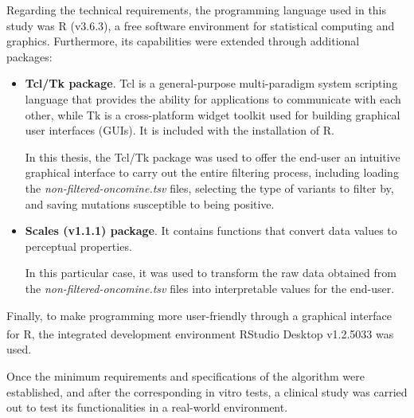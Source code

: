 Regarding the technical requirements, the programming language used in this study was \textsf{R} (v3.6.3), a free software environment for statistical computing and graphics. Furthermore, its capabilities were extended through additional packages:
\begin{itemize}
    \item \textbf{Tcl\slash Tk package}. Tcl is a general-purpose multi-paradigm system scripting language that provides the ability for applications to communicate with each other, while Tk is a cross-platform widget toolkit used for building graphical user interfaces (GUIs). It is included with the installation of \textsf{R}.
    
    In this thesis, the Tcl\slash Tk package was used to offer the end-user an intuitive graphical interface to carry out the entire filtering process, including loading the \textit{non-filtered-oncomine.tsv} files, selecting the type of variants to filter by, and saving mutations susceptible to being positive.
    \item \textbf{Scales (v1.1.1) package}. It contains functions that convert data values to perceptual properties. 
    
    In this particular case, it was used to transform the raw data obtained from the \textit{non-filtered-oncomine.tsv} files into interpretable values for the end-user.
\end{itemize}

Finally, to make programming more user-friendly through a graphical interface for \textsf{R}, the integrated development environment RStudio\textsuperscript\textregistered{} Desktop v1.2.5033 was used.

Once the minimum requirements and specifications of the algorithm were established, and after the corresponding in vitro tests, a clinical study was carried out to test its functionalities in a real-world environment.